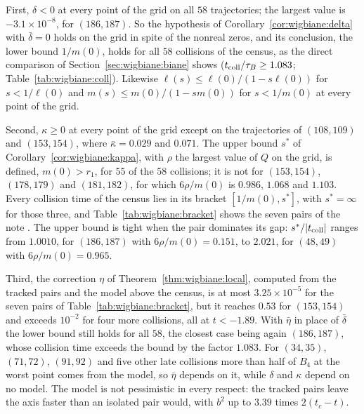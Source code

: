 First, $\delta<0$ at every point of the grid on all $58$ trajectories; the largest value is $-3.1\times10^{-8}$, for $(186,187)$. So the hypothesis of Corollary~\ref{cor:wigbiane:delta} with $\bar\delta=0$ holds on the grid in spite of the nonreal zeros, and its conclusion, the lower bound $1/m(0)$, holds for all $58$ collisions of the census, as the direct comparison of Section~\ref{sec:wigbiane:biane} shows ($t_{\rm coll}/\tau_B\ge1.083$; Table~\ref{tab:wigbiane:coll}). Likewise $\ell(s)\le\ell(0)/(1-s\ell(0))$ for $s<1/\ell(0)$ and $m(s)\le m(0)/(1-sm(0))$ for $s<1/m(0)$ at every point of the grid.

Second, $\kappa\ge0$ at every point of the grid except on the trajectories of $(108,109)$ and $(153,154)$, where $\bar\kappa=0.029$ and $0.071$. The upper bound $s^*$ of Corollary~\ref{cor:wigbiane:kappa}, with $\rho$ the largest value of $Q$ on the grid, is defined, $m(0)>r_1$, for $55$ of the $58$ collisions; it is not for $(153,154)$, $(178,179)$ and $(181,182)$, for which $6\rho/m(0)$ is $0.986$, $1.068$ and $1.103$. Every collision time of the census lies in its bracket $[1/m(0),s^*]$, with $s^*=\infty$ for those three, and Table~\ref{tab:wigbiane:bracket} shows the seven pairs of the note \cite{P26wig}. The upper bound is tight when the pair dominates its gap: $s^*/|t_{\rm coll}|$ ranges from $1.0010$, for $(186,187)$ with $6\rho/m(0)=0.151$, to $2.021$, for $(48,49)$ with $6\rho/m(0)=0.965$.

Third, the correction $\eta$ of Theorem~\ref{thm:wigbiane:local}, computed from the tracked pairs and the model above the census, is at most $3.25\times10^{-5}$ for the seven pairs of Table~\ref{tab:wigbiane:bracket}, but it reaches $0.53$ for $(153,154)$ and exceeds $10^{-2}$ for four more collisions, all at $t<-1.89$. With $\bar\eta$ in place of $\bar\delta$ the lower bound still holds for all $58$, the closest case being again $(186,187)$, whose collision time exceeds the bound by the factor $1.083$. For $(34,35)$, $(71,72)$, $(91,92)$ and five other late collisions more than half of $B_4$ at the worst point comes from the model, so $\bar\eta$ depends on it, while $\delta$ and $\kappa$ depend on no model. The model is not pessimistic in every respect: the tracked pairs leave the axis faster than an isolated pair would, with $b^2$ up to $3.39$ times $2(t_c-t)$.

